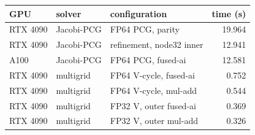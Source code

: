 \begin{tabular}{@{}lllr@{}}
\toprule
GPU & solver & configuration & time (s) \\
\midrule
RTX 4090 & Jacobi-PCG & FP64 PCG, parity & 19.964 \\
RTX 4090 & Jacobi-PCG & refinement, node32 inner & 12.941 \\
A100 & Jacobi-PCG & FP64 PCG, fused-ai & 12.581 \\
RTX 4090 & multigrid & FP64 V-cycle, fused-ai & 0.752 \\
RTX 4090 & multigrid & FP64 V-cycle, mul-add & 0.544 \\
RTX 4090 & multigrid & FP32 V, outer fused-ai & 0.369 \\
RTX 4090 & multigrid & FP32 V, outer mul-add & 0.326 \\
\bottomrule
\end{tabular}
